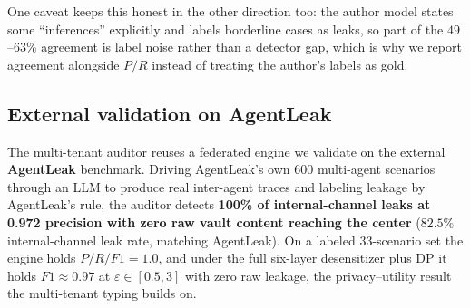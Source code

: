 \documentclass[conference,compsoc]{IEEEtran}
\begin{document}
\begin{table}[t]\centering\small
{}
\caption{What any tagger fix can buy, on one pool of $99$ author-generated
scenarios. Conceding sensitivity recovers the whole reachable gap; conceding every
inferred category recovers none of it. The ceiling is $0.76$, so a quarter of the
author's intended leaks are out of reach of tagging altogether.}
\label{tab:ceiling}
\end{table}

One caveat keeps this honest in the other direction too: the author model states
some ``inferences'' explicitly and labels borderline cases as leaks, so part of the
$49$--$63\%$ agreement is label noise rather than a detector gap, which is why we
report agreement alongside $P/R$ instead of treating the author's labels as gold.

\subsection{External validation on AgentLeak}
The multi-tenant
auditor reuses a federated engine we validate on the external \textbf{AgentLeak}
benchmark. Driving AgentLeak's own 600 multi-agent scenarios through an LLM to
produce real inter-agent traces and labeling leakage by AgentLeak's rule, the
auditor detects \textbf{100\% of internal-channel leaks at 0.972 precision with
zero raw vault content reaching the center} ($82.5\%$ internal-channel leak rate,
matching AgentLeak). On a labeled 33-scenario set the engine holds $P/R/F1=1.0$,
and under the full six-layer desensitizer plus DP it holds $F1\approx0.97$ at
$\varepsilon\in[0.5,3]$ with zero raw leakage, the privacy--utility result the
multi-tenant typing builds on.
\end{document}
